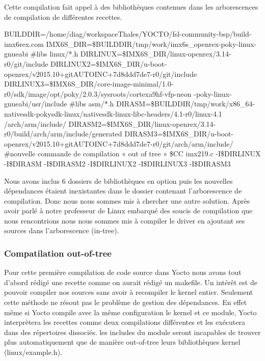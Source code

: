 {Cette compilation fait appel à des bibliothèques contenues dans les arborescences de
compilation de différentes recettes. 

\begin{tcolorbox}
    BUILDDIR=/home/diag/workspaceThales/YOCTO/fsl-community-bsp/build-imx6rex.com
    IMX6S\_DIR=\$BUILDDIR/tmp/work/imx6s\_openrex-poky-linux-gnueabi
    \#libs linux/*.h
    DIRLINUX=\$IMX6S\_DIR/linux-openrex/3.14-r0/git/include
    DIRLINUX2=\$IMX6S\_DIR/u-boot-openrex/v2015.10+gitAUTOINC+7d8ddd7de7-r0/git/include
    DIRLINUX3=\$IMX6S\_DIR/core-image-minimal/1.0-r0/sdk/image/opt/poky/2.0.3/sysroots/cortexa9hf-vfp-neon
    -poky-linux-gnueabi/usr/include
    \#libs asm/*.h
    DIRASM=\$BUILDDIR/tmp/work/x86\_64-nativesdk-pokysdk-linux/nativesdk-linux-libc-headers/4.1-r0/linux-4.1
    /arch/arm/include/
    DIRASM2=\$IMX6S\_DIR/linux-openrex/3.14-r0/build/arch/arm/include/generated
    DIRASM3=\$IMX6S\_DIR/u-boot-openrex/v2015.10+gitAUTOINC+7d8ddd7de7-r0/git/arch/arm/include/
    \#nouvelle commande de compilation « out of tree »
    \$CC imx219.c -I\$DIRLINUX -I\$DIRASM -I\$DIRASM2 -I\$DIRLINUX2 -I\$DIRLINUX3 -I\$DIRASM3
\end{tcolorbox}

Nous avons inclus 6 dossiers de bibliothèques en option puis les nouvelles dépendances
étaient inexistantes dans le dossier contenant l’arborescence de compilation. Donc nous
nous sommes mis à chercher une autre solution. Après avoir parlé à notre professeur de
Linux embarqué des soucis de compilation que nous rencontrions nous nous sommes mis
à compiler le driver en ajoutant ses sources dans l’arborescence (in-tree).

\subsubsection{Compatilation out-of-tree}

Pour cette première compilation de code source dans Yocto nous avons tout d'abord
rédigé une recette comme on aurait rédigé un makefile. Un intérêt est de pouvoir compiler
nos sources sans avoir à recompiler le kernel entier. Seulement cette méthode ne résout
pas le problème de gestion des dépendances. En effet même si Yocto compile avec la
même configuration le kernel et ce module, Yocto interprètera les recettes comme deux
compilations différentes et les exécutera dans des répertoires dissociés. les includes du
module seront incapables de trouver plus automatiquement que de manière out-of-tree
leurs bibliothèques kernel (linux/example.h).

}
